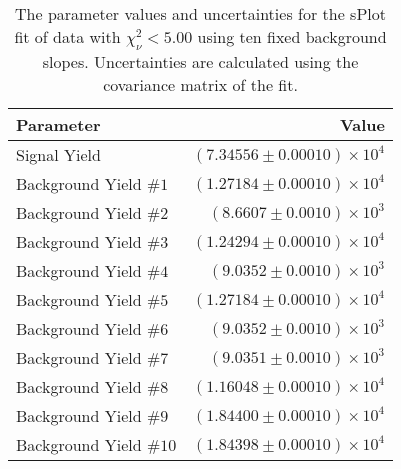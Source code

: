 
\begin{table}[ht]
    \begin{center}
        \begin{tabular}{lr}\toprule
            Parameter & Value \\\midrule
            Signal Yield & $(7.34556 \pm 0.00010) \times 10^{4}$ \\
            Background Yield $\#1$ & $(1.27184 \pm 0.00010) \times 10^{4}$ \\
            Background Yield $\#2$ & $(8.6607 \pm 0.0010) \times 10^{3}$ \\
            Background Yield $\#3$ & $(1.24294 \pm 0.00010) \times 10^{4}$ \\
            Background Yield $\#4$ & $(9.0352 \pm 0.0010) \times 10^{3}$ \\
            Background Yield $\#5$ & $(1.27184 \pm 0.00010) \times 10^{4}$ \\
            Background Yield $\#6$ & $(9.0352 \pm 0.0010) \times 10^{3}$ \\
            Background Yield $\#7$ & $(9.0351 \pm 0.0010) \times 10^{3}$ \\
            Background Yield $\#8$ & $(1.16048 \pm 0.00010) \times 10^{4}$ \\
            Background Yield $\#9$ & $(1.84400 \pm 0.00010) \times 10^{4}$ \\
            Background Yield $\#10$ & $(1.84398 \pm 0.00010) \times 10^{4}$ \\\bottomrule
        \end{tabular}
        \caption{The parameter values and uncertainties for the sPlot fit of data with $\chi^2_\nu < 5.00$ using ten fixed background slopes. Uncertainties are calculated using the covariance matrix of the fit.}\label{tab:splot-fit-results-chisqdof-5.00-fixed-10}
    \end{center}
\end{table}
